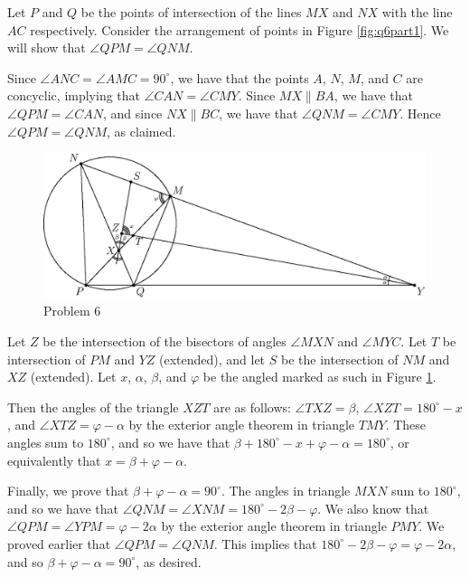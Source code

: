 \documentclass{article}
\begin{document}
\begin{enumerate}[1.]
Let $P$ and $Q$ be the points of intersection of the lines $MX$ and $NX$ with the line $AC$ respectively. Consider the arrangement of points in Figure \ref{fig:q6part1}. We will show that $\angle QPM = \angle QNM$.

Since $\angle ANC = \angle AMC = 90^\circ$, we have that the points $A$, $N$, $M$, and $C$ are concyclic, implying that $\angle CAN = \angle CMY$. Since $MX \parallel BA$, we have that $\angle QPM = \angle CAN$, and since $NX \parallel BC$, we have that $\angle QNM = \angle CMY$. Hence $\angle QPM = \angle QNM$, as claimed.

\begin{figure}[!hb]
	\centering
	\includegraphics{advanced_february_problem6_part2.eps}
	\caption{Problem 6}\label{fig:q6part2}
\end{figure}

Let $Z$ be the intersection of the bisectors of angles $\angle MXN$ and $\angle MYC$. Let $T$ be intersection of $PM$ and $YZ$ (extended), and let $S$ be the intersection of $NM$ and $XZ$ (extended). Let $x$, $\alpha$, $\beta$, and $\varphi$ be the angled marked as such in Figure \ref{fig:q6part2}.

Then the angles of the triangle $XZT$ are as follows: $\angle TXZ = \beta$, $\angle XZT = 180^\circ - x$, and $\angle XTZ = \varphi - \alpha$ by the exterior angle theorem in triangle $TMY$. These angles sum to $180^\circ$, and so we have that $\beta + 180^\circ - x + \varphi - \alpha = 180^\circ$, or equivalently that $x = \beta + \varphi - \alpha$.

Finally, we prove that $\beta + \varphi - \alpha = 90^\circ$. The angles in triangle $MXN$ sum to $180^\circ$, and so we have that $\angle QNM = \angle XNM = 180^\circ - 2\beta - \varphi$. We also know that $\angle QPM = \angle YPM = \varphi - 2\alpha$ by the exterior angle theorem in triangle $PMY$. We proved earlier that $\angle QPM = \angle QNM$. This implies that $180^\circ - 2\beta - \varphi = \varphi - 2\alpha$, and so $\beta + \varphi - \alpha = 90^\circ$, as desired.


\end{enumerate}
\end{document}
